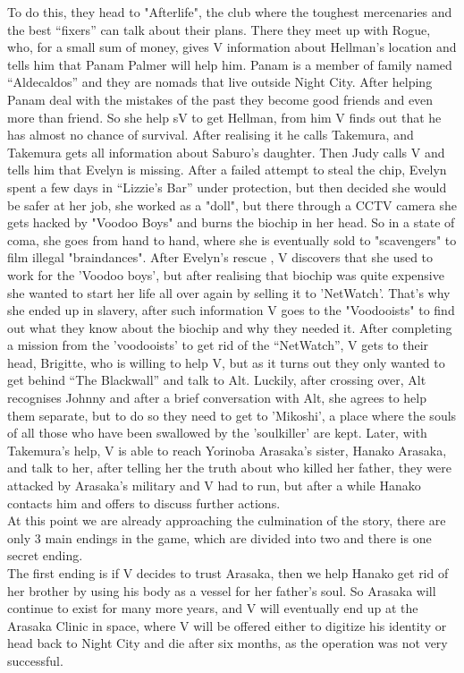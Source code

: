 \documentclass[10pt,twoside,english,a4paper]{article}
\begin{document}
	To do this, they head to "Afterlife", the club where the toughest mercenaries and the best “fixers” can talk about their plans. There they meet up with Rogue, who, for a small sum of money, gives V information about Hellman's location and tells him that Panam Palmer will help him. Panam is a member of family named “Aldecaldos” and they are nomads that live outside Night City. After helping Panam deal with the mistakes of the past they become good friends and even more than friend. So she help sV to get Hellman, from him V finds out that he has almost no chance of survival. After realising it he calls Takemura, and Takemura gets all information about Saburo’s daughter.
	Then Judy calls V and tells him that Evelyn is missing. After a failed attempt to steal the chip, Evelyn spent a few days in “Lizzie's Bar” under protection, but then decided she would be safer at her job, she worked as a "doll", but there through a CCTV camera she gets hacked by "Voodoo Boys" and burns the biochip in her head. So in a state of coma, she goes from hand to hand, where she is eventually sold to "scavengers" to film illegal "braindances". After Evelyn's rescue , V discovers that she used to work for the 'Voodoo boys', but after realising that biochip was quite expensive she wanted to start her life all over again by selling it to  'NetWatch'. That's why she ended up in slavery, after such information V goes to the "Voodooists" to find out what they know about the biochip and why they needed it.
	After completing a mission from the 'voodooists' to get rid of the “NetWatch”, V gets to their head, Brigitte, who is willing to help V, but as it turns out they only wanted to get behind “The Blackwall” and talk to Alt. Luckily, after crossing over, Alt recognises Johnny and after a brief conversation with Alt, she agrees to help them separate, but to do so they need to get to 'Mikoshi', a place where the souls of all those who have been swallowed by the 'soulkiller' are kept.
	Later, with Takemura's help, V is able to reach Yorinoba Arasaka's sister, Hanako Arasaka, and talk to her, after telling her the truth about who killed her father, they were attacked by Arasaka's military and V had to run, but after a while Hanako contacts him and offers to discuss further actions.\\
	At this point we are already approaching the culmination of the story, there are only 3 main endings in the game, which are divided into two and there is one secret ending. \\
The first ending is if V decides to trust Arasaka, then we help Hanako get rid of her brother by using his body as a vessel for her father's soul. So Arasaka will continue to exist for many more years, and V will eventually end up at the Arasaka Clinic in space, where V will be offered either to digitize his identity or head back to Night City and die after six months, as the operation was not very successful.\\
\end{document}
